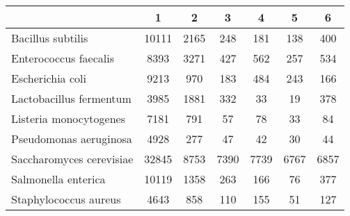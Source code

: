 \begin{adjustbox}{center}
\begin{tabular}{|l||c|c|c|c|c|c|}
\hline
& 1 & 2 & 3 & 4 & 5 & 6 \\
\hline
\hline
Bacillus subtilis & \cellcolor[RGB]{235, 71, 71} 10111 & \cellcolor[RGB]{235, 71, 71} 2165 & \cellcolor[RGB]{241, 241, 253} 248 & \cellcolor[RGB]{227, 227, 252} 181 & \cellcolor[RGB]{218, 218, 251} 138 & \cellcolor[RGB]{253, 237, 237} 400 \\
\hline
Enterococcus faecalis & \cellcolor[RGB]{235, 71, 71} 8393 & \cellcolor[RGB]{235, 71, 71} 3271 & \cellcolor[RGB]{223, 223, 251} 427 & \cellcolor[RGB]{254, 250, 250} 562 & \cellcolor[RGB]{172, 172, 246} 257 & \cellcolor[RGB]{250, 250, 254} 534 \\
\hline
Escherichia coli & \cellcolor[RGB]{235, 71, 71} 9213 & \cellcolor[RGB]{235, 71, 71} 970 & \cellcolor[RGB]{227, 227, 252} 183 & \cellcolor[RGB]{253, 237, 237} 484 & \cellcolor[RGB]{237, 237, 253} 243 & \cellcolor[RGB]{227, 227, 252} 166 \\
\hline
Lactobacillus fermentum & \cellcolor[RGB]{235, 71, 71} 3985 & \cellcolor[RGB]{235, 71, 71} 1881 & \cellcolor[RGB]{250, 250, 254} 332 & \cellcolor[RGB]{218, 218, 251} 33 & \cellcolor[RGB]{218, 218, 251} 19 & \cellcolor[RGB]{254, 250, 250} 378 \\
\hline
Listeria monocytogenes & \cellcolor[RGB]{235, 71, 71} 7181 & \cellcolor[RGB]{235, 71, 71} 791 & \cellcolor[RGB]{223, 223, 251} 57 & \cellcolor[RGB]{250, 250, 254} 78 & \cellcolor[RGB]{186, 186, 247} 33 & \cellcolor[RGB]{254, 250, 250} 84 \\
\hline
Pseudomonas aeruginosa & \cellcolor[RGB]{235, 71, 71} 4928 & \cellcolor[RGB]{235, 71, 71} 277 & \cellcolor[RGB]{253, 241, 241} 47 & \cellcolor[RGB]{227, 227, 252} 42 & \cellcolor[RGB]{94, 94, 237} 30 & \cellcolor[RGB]{241, 241, 253} 44 \\
\hline
Saccharomyces cerevisiae & \cellcolor[RGB]{235, 71, 71} 32845 & \cellcolor[RGB]{247, 182, 182} 8753 & \cellcolor[RGB]{246, 246, 254} 7390 & \cellcolor[RGB]{254, 246, 246} 7739 & \cellcolor[RGB]{218, 218, 251} 6767 & \cellcolor[RGB]{223, 223, 251} 6857 \\
\hline
Salmonella enterica & \cellcolor[RGB]{235, 71, 71} 10119 & \cellcolor[RGB]{235, 71, 71} 1358 & \cellcolor[RGB]{246, 246, 254} 263 & \cellcolor[RGB]{223, 223, 251} 166 & \cellcolor[RGB]{209, 209, 250} 76 & \cellcolor[RGB]{253, 241, 241} 377 \\
\hline
Staphylococcus aureus & \cellcolor[RGB]{235, 71, 71} 4643 & \cellcolor[RGB]{235, 71, 71} 858 & \cellcolor[RGB]{227, 227, 252} 110 & \cellcolor[RGB]{253, 241, 241} 155 & \cellcolor[RGB]{172, 172, 246} 51 & \cellcolor[RGB]{241, 241, 253} 127 \\
\hline
\end{tabular}
\end{adjustbox}
